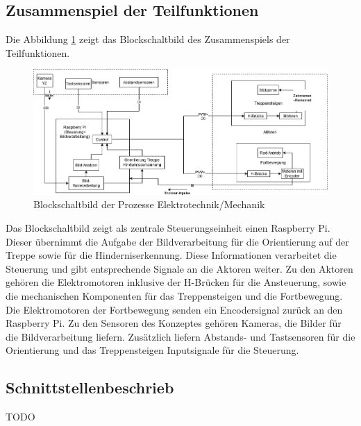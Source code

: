 \newpage
\subsection{Zusammenspiel der Teilfunktionen}
 Die Abbildung \ref{fig3} zeigt das Blockschaltbild des Zusammenspiels der Teilfunktionen.

\begin{figure}[h]
  \includegraphics[width=\textwidth]{img/Funktionsmuster Treppensteigen/Blockschaltbild.png}
  \centering
  \caption{Blockschaltbild der Prozesse Elektrotechnik/Mechanik}
  \label{fig3}
\end{figure}

 Das Blockschaltbild zeigt als zentrale Steuerungseinheit einen Raspberry Pi. Dieser übernimmt die Aufgabe der Bildverarbeitung für die Orientierung auf der Treppe sowie für die Hinderniserkennung. Diese Informationen verarbeitet die Steuerung und gibt entsprechende Signale an die Aktoren weiter. Zu den Aktoren gehören die Elektromotoren inklusive der H-Brücken für die Ansteuerung, sowie die mechanischen Komponenten für das Treppensteigen und die Fortbewegung. Die Elektromotoren der Fortbewegung senden ein Encodersignal zurück an den Raspberry Pi. Zu den Sensoren des Konzeptes gehören Kameras, die Bilder für die Bildverarbeitung liefern. Zusätzlich liefern Abstands- und Tastsensoren für die Orientierung und das Treppensteigen Inputsignale für die Steuerung.
 
\subsection{Schnittstellenbeschrieb}

TODO